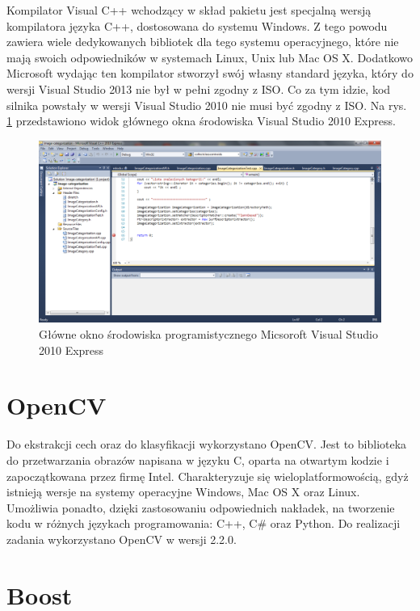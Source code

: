 Kompilator Visual C++ wchodzący w skład pakietu jest specjalną wersją kompilatora języka C++, dostosowana do systemu Windows. Z tego powodu zawiera wiele dedykowanych bibliotek dla tego systemu operacyjnego, które nie mają swoich odpowiedników w systemach Linux, Unix lub Mac OS X. Dodatkowo Microsoft wydając ten kompilator stworzył swój własny standard języka, który do wersji Visual Studio 2013 nie był w pełni zgodny z ISO. Co za tym idzie, kod silnika powstały w wersji Visual Studio 2010 nie musi być zgodny z ISO. Na rys. \ref{fig:visual-studio-main-window} przedstawiono widok głównego okna środowiska Visual Studio 2010 Express.\cite{MSDN13}

\begin{figure}[h]
	\centering
	\includegraphics[scale=0.4]{graphics/03_implementacja/visual-studio-main-window.pdf}
	\caption{ Główne okno środowiska programistycznego Micsoroft Visual Studio 2010 Express }
	\label{fig:visual-studio-main-window}
\end{figure}

\section{OpenCV}

Do ekstrakcji cech oraz do klasyfikacji wykorzystano OpenCV. Jest to biblioteka do przetwarzania obrazów napisana w języku C, oparta na otwartym kodzie i zapoczątkowana przez firmę Intel. Charakteryzuje się wieloplatformowością, gdyż istnieją wersje na systemy operacyjne Windows, Mac OS X oraz Linux. Umożliwia ponadto, dzięki zastosowaniu odpowiednich nakładek, na tworzenie kodu w różnych językach programowania: C++, C\# oraz Python. Do realizacji zadania wykorzystano OpenCV w wersji 2.2.0.\cite{OPENCV}

\section{Boost}

